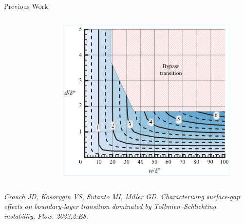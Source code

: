 \documentclass[aspectratio=43, xcolor=table]{beamer}
\begin{document}
\begin{frame}{Previous Work}
	\begin{columns}[T] %
		\begin{column}{0.495\linewidth} %
			\vspace{1.5cm}
			\begin{figure}
				\fboxsep=0pt %
			\end{figure}
		\end{column}
		\begin{column}{0.495\linewidth} %
			\begin{figure}
				\vspace{0.15cm}
				\includegraphics[width=\textwidth]{Images/jeffHeatMap.pdf}
			\end{figure}
		\end{column}
	\end{columns}
	\vspace{0.2cm}

	{\fontsize{6}{8}\selectfont
		\textit{Crouch JD, Kosorygin VS, Sutanto MI, Miller GD. Characterizing surface-gap effects on boundary-layer transition dominated by Tollmien–Schlichting instability. Flow. 2022;2:E8.}}
\end{frame}
\end{document}
